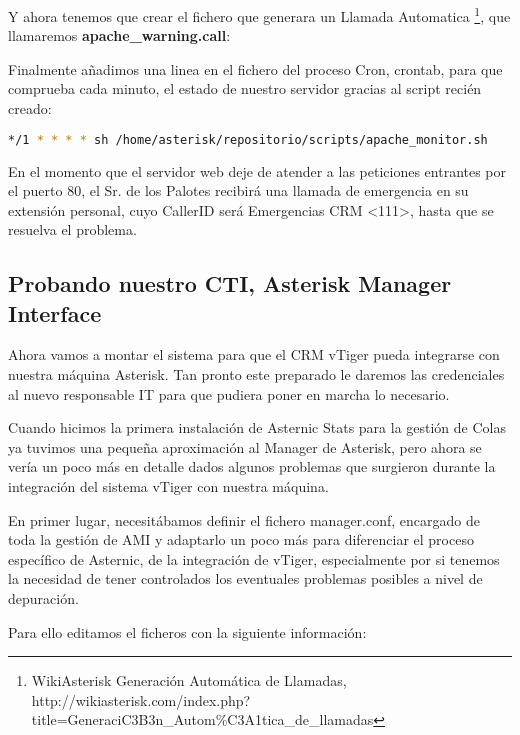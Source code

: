 Y ahora tenemos que crear el fichero que generara un Llamada Automatica \footnote{WikiAsterisk Generación Automática de Llamadas, \\ http://wikiasterisk.com/index.php?title=GeneraciC3B3n\_Autom\%C3A1tica\_de\_llamadas}, que llamaremos \textbf{apache\_warning.call}:



Finalmente añadimos una linea en el fichero del proceso Cron, crontab, para que comprueba cada minuto, el estado de nuestro servidor gracias al script recién creado:

\begin{lstlisting}[language=bash,title={/etc/crontab}]
*/1 * * * * sh /home/asterisk/repositorio/scripts/apache_monitor.sh
\end{lstlisting}

En el momento que el servidor web deje de atender a las peticiones entrantes por el puerto 80, el Sr. de los Palotes recibirá una llamada de emergencia en su extensión personal, cuyo CallerID será Emergencias CRM <111>, hasta que se resuelva el problema.

\newpage

\subsection{Probando nuestro CTI, Asterisk Manager Interface}

Ahora vamos a montar el sistema para que el CRM vTiger pueda integrarse con nuestra máquina Asterisk. Tan pronto este preparado le daremos las credenciales al nuevo responsable IT para que pudiera poner en marcha lo necesario.

Cuando hicimos la primera instalación de Asternic Stats para la gestión de Colas ya tuvimos una pequeña aproximación al Manager de Asterisk, pero ahora se vería un poco más en detalle dados algunos problemas que surgieron durante la integración del sistema vTiger con nuestra máquina.

En primer lugar, necesitábamos definir el fichero manager.conf, encargado de toda la gestión de AMI y adaptarlo un poco más para diferenciar el proceso específico de Asternic, de la integración de vTiger, especialmente por si tenemos la necesidad de tener controlados los eventuales problemas posibles a nivel de depuración.

Para ello editamos el ficheros con la siguiente información:

